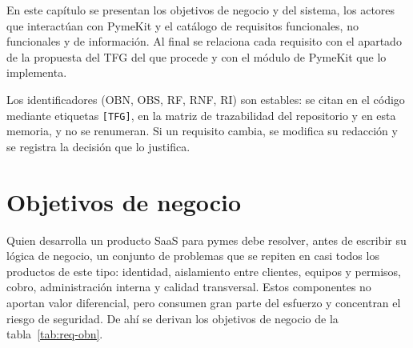 
En este capítulo se presentan los objetivos de negocio y del sistema, los
actores que interactúan con PymeKit y el catálogo de requisitos funcionales,
no funcionales y de información. Al final se relaciona cada requisito con el
apartado de la propuesta del TFG del que procede y con el módulo de PymeKit
que lo implementa.

Los identificadores (OBN, OBS, RF, RNF, RI) son estables: se citan en el
código mediante etiquetas \texttt{[TFG]}, en la matriz de trazabilidad del
repositorio y en esta memoria, y no se renumeran. Si un requisito cambia, se
modifica su redacción y se registra la decisión que lo justifica.

\section{Objetivos de negocio}
\label{sec:req-objetivos-negocio}

Quien desarrolla un producto SaaS para pymes debe resolver, antes de escribir
su lógica de negocio, un conjunto de problemas que se repiten en casi todos
los productos de este tipo: identidad, aislamiento entre clientes, equipos y
permisos, cobro, administración interna y calidad transversal. Estos
componentes no aportan valor diferencial, pero consumen gran parte del
esfuerzo y concentran el riesgo de seguridad. De ahí se derivan los objetivos
de negocio de la tabla~\ref{tab:req-obn}.

